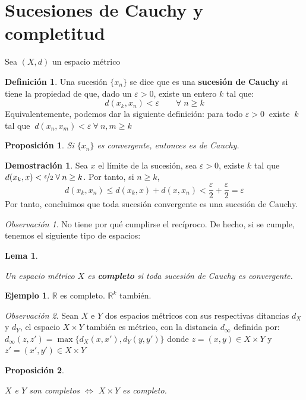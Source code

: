 \documentclass[12pt,twoside]{report}
\theoremstyle{azul}
\theoremstyle{azul2}
\theoremstyle{plain}
\newtheorem*{prop}{Proposición}
\newtheorem*{lem}{Lema}
\theoremstyle{definition}
\newtheorem*{eje}{Ejemplo}
\newtheorem*{defi}{Definición}
\newtheorem*{dem}{Demostración}
\theoremstyle{remark}
\newtheorem*{obs}{Observación}
\begin{document}
\section{Sucesiones de Cauchy y completitud}
Sea $(X,d)$ un espacio m{\'e}trico
\begin{defi} 
Una sucesión $\{ x_n \}$ se dice que es una \textbf{sucesión de Cauchy} si tiene la propiedad de que, dado un $\varepsilon > 0$, existe un entero $k$ tal que:
$$d(x_k, x_n) < \varepsilon \qquad \forall \; n \geq k$$
Equivalentemente, podemos dar la siguiente definición: para todo $\varepsilon > 0 \:$ existe $ \: k \: $ tal que $ \: d(x_n,x_m) <  \varepsilon \: \forall \: n,m \geq k$

\end{defi}
\begin{prop}
Si $\{ x_n \}$ es convergente, entonces es de Cauchy.
\end{prop}
\begin{dem}
Sea $x$ el límite de la sucesión, sea $\varepsilon > 0$, existe $k$ tal que $d(x_k, x) < \nicefrac{\varepsilon}{2} \; \forall \: n \geq k$. Por tanto, si $n \geq k$,
$$d(x_k, x_n) \leq d(x_k, x) + d(x,x_n) < \dfrac{\varepsilon}{2} +\dfrac{\varepsilon}{2} = \varepsilon$$
Por tanto, concluimos que toda sucesión convergente es una sucesión de Cauchy.
\end{dem}
\begin{obs}
No tiene por qu{\'e} cumplirse el recíproco. De hecho, si se cumple, tenemos el siguiente tipo de espacios:
\end{obs}
\begin{lem}\; 
\begin{tcolorbox}
Un espacio m{\'e}trico $X$ es \textbf{completo} si toda sucesión de Cauchy es convergente.
\end{tcolorbox}
\end{lem}
\begin{eje}
$\mathbb{R}$ es completo. $\mathbb{R}^k$ también. 
\end{eje}
\begin{obs}

Sean $X$ e $Y$ dos espacios m{\'e}tricos con sus respectivas ditancias $d_X$ y $d_Y$, el espacio $X \times Y$ tambi{\'e}n es m{\'e}trico, con la distancia $d_{\infty}$ definida por: $d_{\infty}(z,z')=\max\{d_X(x,x'), d_Y(y,y')\}$ donde $z = (x,y)\in X \times Y$ y $z' = (x',y')\in X \times Y$

\end{obs}
\begin{prop} \; 
\vspace{-3mm}\begin{center}
    $X$ e $Y$ son completos $\Leftrightarrow$ $X \times Y$ es completo.
\end{center}
\end{prop}
\end{document}
